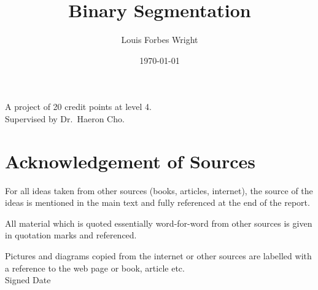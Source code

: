 \documentclass[a4paper, 12pt, notitlepage]{report}
\title{Binary Segmentation}
\author{Louis Forbes Wright}
\date{\today}
\begin{document}
\maketitle





%


\begin{center}
A project of 20 credit points at level 4. %
\\[12pt]
Supervised by Dr.\ Haeron Cho. 
\end{center}
\thispagestyle{empty}
\newpage
\section*{Acknowledgement of Sources} %
For all ideas taken from other sources (books, articles, internet), the source of the ideas is mentioned in the main text and fully referenced at the end of the report.

All material which is quoted essentially word-for-word from other sources is given in quotation marks and referenced.

Pictures and diagrams copied from the internet or other sources are labelled with a reference to the web page or book, article etc.
\\[12pt]
Signed \dotfill Date \dotfill

\newpage
\end{document}
